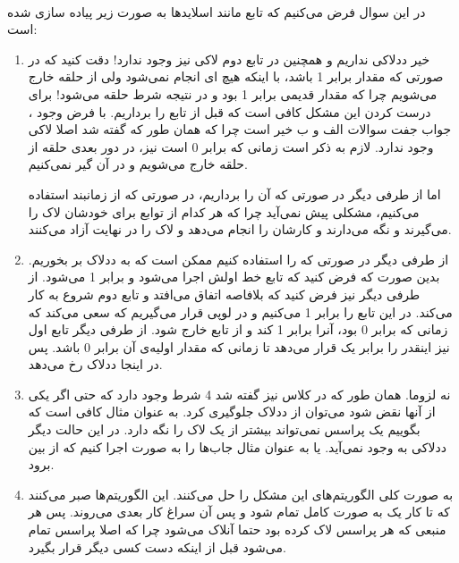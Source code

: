 \\\noindent
در این سوال فرض می‌کنیم که تابع
مانند اسلاید‌ها به صورت زیر پیاده سازی شده است:
\begin{enumerate}
    \item خیر ددلاکی نداریم و همچنین در تابع دوم لاکی نیز وجود ندارد!
    دقت کنید که در صورتی که مقدار
    برابر 1 باشد، با اینکه هیچ
    ای
    انجام نمی‌شود ولی از حلقه خارج می‌شویم چرا که مقدار قدیمی
    برابر 1 بود و در نتیجه شرط حلقه
    می‌شود! برای درست کردن این مشکل کافی است که
    \codeword{!}
    قبل از تابع را برداریم.
    با فرض وجود
    ،
    جواب جفت سوالات الف و ب خیر است چرا که همان طور که گفته شد اصلا لاکی وجود ندارد.
    لازم به ذکر است زمانی که
    برابر 0 است نیز، در دور بعدی حلقه از حلقه خارج می‌شویم و در آن گیر نمی‌کنیم.

    \noindent
    اما از طرفی دیگر در صورتی که آن
    \codeword{!}
    را برداریم، در صورتی که از زمانبند
    استفاده می‌کنیم، مشکلی پیش نمی‌آید چرا که هر کدام از توابع برای خودشان لاک را می‌گیرند و نگه می‌دارند
    و کارشان را انجام می‌دهد و لاک را در نهایت آزاد می‌کنند.
    \item از طرفی دیگر در صورتی که
    را استفاده کنیم ممکن است که به ددلاک بر بخوریم. بدین صورت که فرض کنید که تابع
    خط اولش اجرا می‌شود و
    برابر 1 می‌شود. از طرفی دیگر نیز فرض کنید که بلافاصه
    اتفاق می‌افتد و تابع دوم شروع به کار می‌کند. در این تابع
    را برابر 1 می‌کنیم و در لوپی قرار می‌گیریم که سعی می‌کند که زمانی که
    برابر 0 بود، آنرا برابر 1 کند و از تابع خارج شود.
    از طرفی دیگر تابع اول نیز اینقدر
    را برابر یک قرار می‌دهد تا زمانی که مقدار اولیه‌ی آن برابر 0 باشد. پس در اینجا ددلاک رخ می‌دهد.
    \item نه لزوما. همان طور که در کلاس نیز گفته شد 4 شرط وجود دارد که حتی اگر یکی از آنها نقض شود می‌توان
    از ددلاک جلوگیری کرد. به عنوان مثال کافی است که بگوییم یک پراسس نمی‌تواند بیشتر از یک لاک را نگه دارد.
    در این حالت دیگر ددلاکی به وجود نمی‌آید. یا به عنوان مثال جاب‌ها را به صورت
    اجرا کنیم که
    از بین برود.
    \item به صورت کلی الگوریتم‌های
    این مشکل را حل می‌کنند. این الگوریتم‌ها صبر می‌کنند که تا کار یک
    به صورت کامل تمام شود و پس آن سراغ کار بعدی می‌روند. پس هر منبعی که هر پراسس لاک کرده بود
    حتما آنلاک می‌شود چرا که اصلا پراسس تمام می‌شود قبل از اینکه
    دست کسی دیگر قرار بگیرد.
\end{enumerate}



